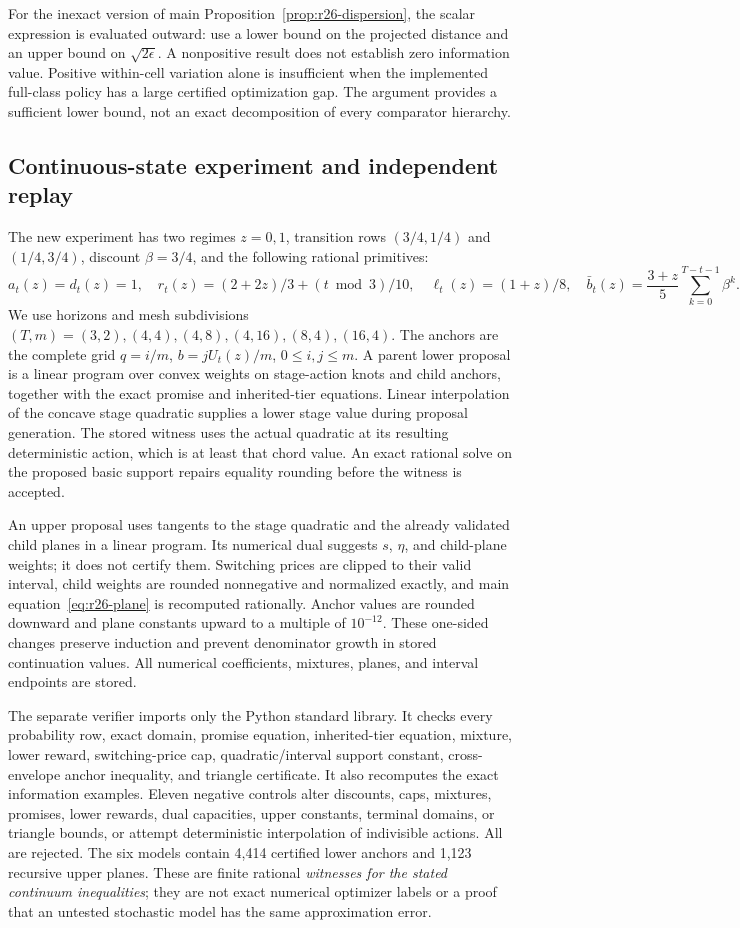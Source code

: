 For the inexact version of main Proposition~\ref{prop:r26-dispersion}, the scalar expression is evaluated outward: use a lower bound on the projected distance and an upper bound on $\sqrt{2\epsilon}$. A nonpositive result does not establish zero information value. Positive within-cell variation alone is insufficient when the implemented full-class policy has a large certified optimization gap. The argument provides a sufficient lower bound, not an exact decomposition of every comparator hierarchy.

\subsection{Continuous-state experiment and independent replay}
The new experiment has two regimes $z=0,1$, transition rows $(3/4,1/4)$ and $(1/4,3/4)$, discount $\beta=3/4$, and the following rational primitives:
\[
 a_t(z)=d_t(z)=1,\quad
 r_t(z)=(2+2z)/3+(t\bmod3)/10,\quad
 \ell_t(z)=(1+z)/8,\quad
 \bar b_t(z)=\frac{3+z}{5}\sum_{k=0}^{T-t-1}\beta^k.
\]
We use horizons and mesh subdivisions $(T,m)=(3,2),(4,4),(4,8),(4,16),(8,4),(16,4)$. The anchors are the complete grid $q=i/m$, $b=jU_t(z)/m$, $0\leq i,j\leq m$. A parent lower proposal is a linear program over convex weights on stage-action knots and child anchors, together with the exact promise and inherited-tier equations. Linear interpolation of the concave stage quadratic supplies a lower stage value during proposal generation. The stored witness uses the actual quadratic at its resulting deterministic action, which is at least that chord value. An exact rational solve on the proposed basic support repairs equality rounding before the witness is accepted.

An upper proposal uses tangents to the stage quadratic and the already validated child planes in a linear program. Its numerical dual suggests $s$, $\eta$, and child-plane weights; it does not certify them. Switching prices are clipped to their valid interval, child weights are rounded nonnegative and normalized exactly, and main equation~\eqref{eq:r26-plane} is recomputed rationally. Anchor values are rounded downward and plane constants upward to a multiple of $10^{-12}$. These one-sided changes preserve induction and prevent denominator growth in stored continuation values. All numerical coefficients, mixtures, planes, and interval endpoints are stored.

The separate verifier imports only the Python standard library. It checks every probability row, exact domain, promise equation, inherited-tier equation, mixture, lower reward, switching-price cap, quadratic/interval support constant, cross-envelope anchor inequality, and triangle certificate. It also recomputes the exact information examples. Eleven negative controls alter discounts, caps, mixtures, promises, lower rewards, dual capacities, upper constants, terminal domains, or triangle bounds, or attempt deterministic interpolation of indivisible actions. All are rejected. The six models contain 4,414 certified lower anchors and 1,123 recursive upper planes. These are finite rational \emph{witnesses for the stated continuum inequalities}; they are not exact numerical optimizer labels or a proof that an untested stochastic model has the same approximation error.

